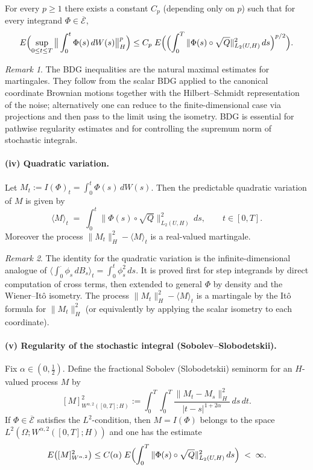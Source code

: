 \documentclass[11pt]{article}
\theoremstyle{definition}
\theoremstyle{remark}
\newtheorem{remark}{Remark}
\begin{document}
For every $p \ge 1$ there exists a constant $C_p$ (depending only on $p$) such that for every integrand $\Phi \in \overline{\mathcal{E}}$,
\[
        E\Bigl(\sup_{0 \le t \le T} \big\|\int_0^t \Phi(s)\,dW(s)\big\|_H^p\Bigr)
        \le C_p\; E\Bigl(\Bigl(\int_0^T \|\Phi(s) \circ \sqrt{Q}\|_{L_2(U,H)}^2\,ds\Bigr)^{p/2}\Bigr).
\]

\begin{remark}
The BDG inequalities are the natural maximal estimates for martingales.  They follow from the scalar BDG applied to the canonical coordinate Brownian motions together with the Hilbert--Schmidt representation of the noise; alternatively one can reduce to the finite-dimensional case via projections and then pass to the limit using the isometry.  BDG is essential for pathwise regularity estimates and for controlling the supremum norm of stochastic integrals.
\end{remark}

\paragraph{(iv) Quadratic variation.}

Let $M_t := I(\Phi)_t = \int_0^t \Phi(s)\,dW(s)$.  Then the predictable quadratic variation of $M$ is given by
\[
        \langle M \rangle_t 
        \;=
        \;\int_0^t \|\Phi(s) \circ \sqrt{Q}\|_{L_2(U,H)}^2\,ds,
        \qquad t \in [0,T].
\]
Moreover the process $\|M_t\|_H^2 - \langle M \rangle_t$ is a real-valued martingale.

\begin{remark}
The identity for the quadratic variation is the infinite-dimensional analogue of
$\langle \int_0^\cdot \phi_s\,dB_s\rangle_t = \int_0^t \phi_s^2\,ds$.
It is proved first for step integrands by direct computation of cross terms,
then extended to general $\Phi$ by density and the Wiener--It\^o isometry.
The process $\|M_t\|_H^2 - \langle M\rangle_t$ is a martingale by the It\^o formula for
$\|M_t\|_H^2$ (or equivalently by applying the scalar isometry to each coordinate).
\end{remark}

\paragraph{(v) Regularity of the stochastic integral (Sobolev--Slobodetskii).}

Fix $\alpha \in (0,\tfrac12)$.  Define the fractional Sobolev (Slobodetskii) seminorm for an $H$-valued process $M$ by
\[
        [M]_{W^{\alpha,2}([0,T];H)}^2
        :=
        \int_0^T\int_0^T \frac{\|M_t - M_s\|_H^2}{|t-s|^{1+2\alpha}}\,ds\,dt.
\]
If $\Phi \in \overline{\mathcal{E}}$ satisfies the $L^2$-condition, then $M = I(\Phi)$ belongs to the space $L^2(\Omega;W^{\alpha,2}([0,T];H))$ and one has the estimate
\[
        E\bigl([M]_{W^{\alpha,2}}^2\bigr)
        \le C(\alpha)\; E\Bigl(\int_0^T \|\Phi(s) \circ \sqrt{Q}\|_{L_2(U,H)}^2\,ds\Bigr)
        \;<\; \infty.
\]
\end{document}
